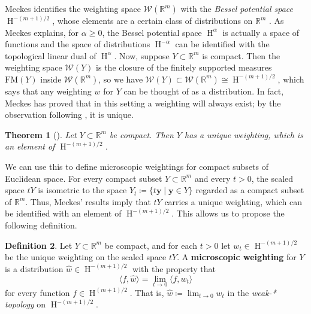 \documentclass[a4paper, oneside, reqno]{amsart}
\newtheorem{theorem}{Theorem}[section]
\theoremstyle{definition}
\newtheorem{definition}[theorem]{Definition}
\theoremstyle{remark}
\numberwithin{equation}{section}
\renewcommand{\vec}{\mathbf}
\newcommand{\R}{\mathbb{R}}
\newcommand{\define}{\textbf}
\newcommand{\finsuppmeas}{\mathrm{FM}}
\newcommand{\wtspace}{\mathcal{W}}
\newcommand{\dispair}[2]{\langle #2,#1 \rangle}
\DeclareMathOperator{\besselspace}{H}
\begin{document}
Meckes identifies the weighting space \(\wtspace(\R^m)\) with the \emph{Bessel potential space} \(\besselspace^{-(m+1)/2}\), whose elements are a certain class of distributions on \(\R^m\) \cite[Proposition~5.1]{Meckes:magnitude-diversity-capacity-dimension}. As Meckes explains, for \(\alpha \geq 0\), the Bessel potential space \(\besselspace^{\alpha}\) is actually a space of functions and the space of distributions \(\besselspace^{-\alpha}\) can be identified with the topological linear dual of \(\besselspace^{\alpha}\). Now, suppose \(Y \subset \R^m\) is compact. Then the weighting space \(\wtspace(Y)\) is the closure of the finitely supported measures \(\finsuppmeas(Y)\) inside \(\wtspace(\R^m)\), so we have \(\wtspace(Y) \subset \wtspace(\R^m) \cong \besselspace^{-(m+1)/2}\), which says that any weighting \(w\) for \(Y\) can be thought of as a distribution. In fact, Meckes has proved that in this setting a weighting will always exist; by the observation following , it is unique.

\begin{theorem}[{\cite[Corollary~5.3]{Meckes:magnitude-diversity-capacity-dimension}}]
\label{thm:compact-Y-has-weighting}
Let \(Y \subset \R^m\) be compact. Then \(Y\) has a unique weighting, which is an element of \(\besselspace^{-(m+1)/2}\).
\end{theorem}

We can use this to define microscopic weightings for compact subsets of Euclidean space. For every compact subset \(Y \subset \R^m\) and every \(t > 0\), the scaled space \(tY\) 
is isometric to the space \(Y_t \coloneq \{ t \vec{y} \mid \vec{y} \in Y\}\) regarded as a compact subset of \(\R^m\). Thus, Meckes' results imply that \(tY\) carries a unique weighting, which can be identified with an element of \(\besselspace^{-(m+1)/2}\). This allows us to propose the following definition.

\begin{definition}
\label{def:microwtg-compact}
Let \(Y \subset \R^m\) be compact, and for each \(t > 0\) let \(w_t \in \besselspace^{-(m+1)/2}\) be the unique weighting on the scaled space \(tY\). A \define{microscopic weighting} for \(Y\) is a distribution \(\widehat{w} \in \besselspace^{-(m+1)/2}\) with the property that
\begin{equation}
\label{eq:microwtg-compact}
\dispair{\widehat{w}}{f} = \lim_{t \to 0} \dispair{w_t}{f}
\end{equation}
for every function \(f \in \besselspace^{(m+1)/2}\). That is, \(\widehat{w} \coloneq \lim_{t \to 0} w_t\) in the \emph{weak-* topology} on \(\besselspace^{-(m+1)/2}\).
\end{definition}
\end{document}
